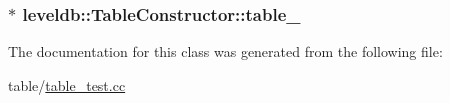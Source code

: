 \subsubsection[{table\+\_\+}]{$\ast$ leveldb\+::\+Table\+Constructor\+::table\+\_\+\hspace{0.3cm}{\ttfamily [private]}}\label{classleveldb_1_1_table_constructor_a502747db59d0b700d4e61e2ee558f053}


The documentation for this class was generated from the following file\+:\begin{DoxyCompactItemize}
\item 
table/\hyperlink{table__test_8cc}{table\+\_\+test.\+cc}\end{DoxyCompactItemize}
